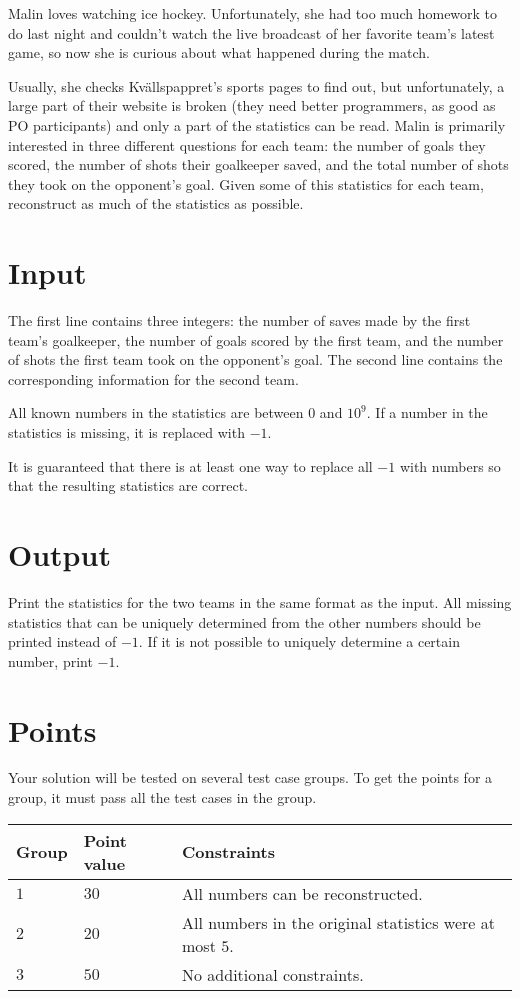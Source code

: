 \noindent
Malin loves watching ice hockey. 
Unfortunately, she had too much homework to do last night and couldn’t watch the live broadcast of her favorite team’s latest game, so now she is curious about what happened during the match.

Usually, she checks Kvällspappret’s sports pages to find out, but unfortunately, 
a large part of their website is broken (they need better programmers, as good as PO participants) and only a part of the statistics can be read. 
Malin is primarily interested in three different questions for each team: the number of goals they scored, the number of shots their goalkeeper saved, and the total number of shots they took on the opponent’s goal. 
Given some of this statistics for each team, reconstruct as much of the statistics as possible.

\section*{Input}
The first line contains three integers: the number of saves made by the first team's goalkeeper, the number of goals scored by the first team, and the number of shots the first team took on the opponent's goal.
The second line contains the corresponding information for the second team.

All known numbers in the statistics are between $0$ and $10^9$.
If a number in the statistics is missing, it is replaced with $-1$.

It is guaranteed that there is at least one way to replace all $-1$ with numbers so that the resulting statistics are correct.

\section*{Output}
Print the statistics for the two teams in the same format as the input.
All missing statistics that can be uniquely determined from the other numbers should be printed instead of $-1$.
If it is not possible to uniquely determine a certain number, print $-1$.

\section*{Points}
Your solution will be tested on several test case groups.
To get the points for a group, it must pass all the test cases in the group.

\noindent
\begin{tabular}{| l | l | p{12cm} |}
  \hline
  \textbf{Group} & \textbf{Point value} & \textbf{Constraints} \\ \hline
  $1$   & $30$         & All numbers can be reconstructed. \\ \hline
  $2$   & $20$         & All numbers in the original statistics were at most $5$. \\ \hline
  $3$   & $50$         & No additional constraints. \\ \hline
\end{tabular}

